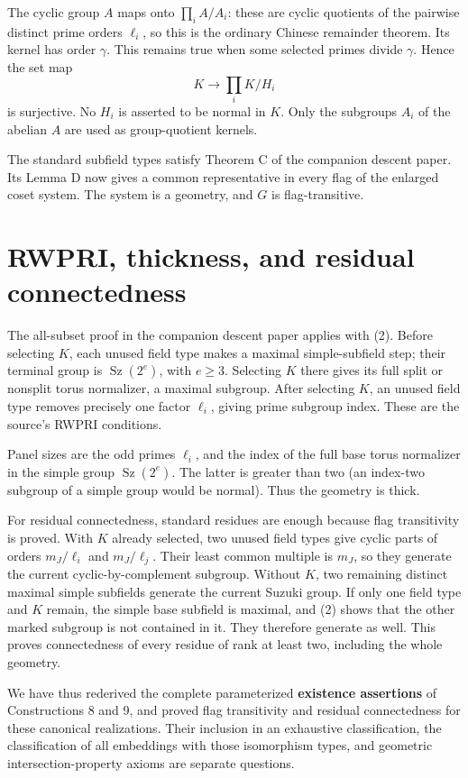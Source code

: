 \documentclass[11pt,a4paper]{article}
\begin{document}
The cyclic group \(A\) maps onto \(\prod_i A/A_i\): these are cyclic
quotients of the pairwise distinct prime orders \(\ell_i\), so this is
the ordinary Chinese remainder theorem. Its kernel has order \(\gamma\).
This remains true when some selected primes divide \(\gamma\). Hence the
set map \[
K\longrightarrow\prod_i K/H_i
\] is surjective. No \(H_i\) is asserted to be normal in \(K\). Only the
subgroups \(A_i\) of the abelian \(A\) are used as group-quotient
kernels.

The standard subfield types satisfy Theorem C of the companion descent
paper. Its Lemma D now gives a common representative in every flag of
the enlarged coset system. The system is a geometry, and \(G\) is
flag-transitive.

\section{RWPRI, thickness, and residual
connectedness}\label{rwpri-thickness-and-residual-connectedness}

The all-subset proof in the companion descent paper applies with (2).
Before selecting \(K\), each unused field type makes a maximal
simple-subfield step; their terminal group is
\(\operatorname{Sz}(2^e)\), with \(e\ge3\). Selecting \(K\) there gives
its full split or nonsplit torus normalizer, a maximal subgroup. After
selecting \(K\), an unused field type removes precisely one factor
\(\ell_i\), giving prime subgroup index. These are the source's RWPRI
conditions.

Panel sizes are the odd primes \(\ell_i\), and the index of the full
base torus normalizer in the simple group \(\operatorname{Sz}(2^e)\).
The latter is greater than two (an index-two subgroup of a simple group
would be normal). Thus the geometry is thick.

For residual connectedness, standard residues are enough because flag
transitivity is proved. With \(K\) already selected, two unused field
types give cyclic parts of orders \(m_J/\ell_i\) and \(m_J/\ell_j\).
Their least common multiple is \(m_J\), so they generate the current
cyclic-by-complement subgroup. Without \(K\), two remaining distinct
maximal simple subfields generate the current Suzuki group. If only one
field type and \(K\) remain, the simple base subfield is maximal, and
(2) shows that the other marked subgroup is not contained in it. They
therefore generate as well. This proves connectedness of every residue
of rank at least two, including the whole geometry.

We have thus rederived the complete parameterized \textbf{existence
assertions} of Constructions 8 and 9, and proved flag transitivity and
residual connectedness for these canonical realizations. Their inclusion
in an exhaustive classification, the classification of all embeddings
with those isomorphism types, and geometric intersection-property axioms
are separate questions.
\end{document}
